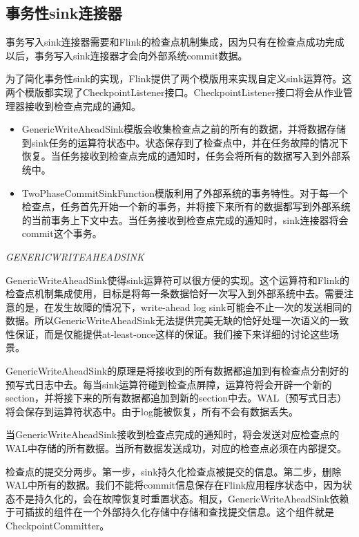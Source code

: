 \documentclass[cn,11pt,chinese]{elegantbook}
\providecommand{\tightlist}{%
  \setlength{\itemsep}{0pt}\setlength{\parskip}{0pt}}
\begin{document}
\hypertarget{ux4e8bux52a1ux6027sinkux8fdeux63a5ux5668}{%
\subsection{事务性sink连接器}\label{ux4e8bux52a1ux6027sinkux8fdeux63a5ux5668}}

事务写入sink连接器需要和Flink的检查点机制集成，因为只有在检查点成功完成以后，事务写入sink连接器才会向外部系统commit数据。

为了简化事务性sink的实现，Flink提供了两个模版用来实现自定义sink运算符。这两个模版都实现了CheckpointListener接口。CheckpointListener接口将会从作业管理器接收到检查点完成的通知。

\begin{itemize}
\tightlist
\item
  GenericWriteAheadSink模版会收集检查点之前的所有的数据，并将数据存储到sink任务的运算符状态中。状态保存到了检查点中，并在任务故障的情况下恢复。当任务接收到检查点完成的通知时，任务会将所有的数据写入到外部系统中。
\item
  TwoPhaseCommitSinkFunction模版利用了外部系统的事务特性。对于每一个检查点，任务首先开始一个新的事务，并将接下来所有的数据都写到外部系统的当前事务上下文中去。当任务接收到检查点完成的通知时，sink连接器将会commit这个事务。
\end{itemize}

\emph{GENERICWRITEAHEADSINK}

GenericWriteAheadSink使得sink运算符可以很方便的实现。这个运算符和Flink的检查点机制集成使用，目标是将每一条数据恰好一次写入到外部系统中去。需要注意的是，在发生故障的情况下，write-ahead
log
sink可能会不止一次的发送相同的数据。所以GenericWriteAheadSink无法提供完美无缺的恰好处理一次语义的一致性保证，而是仅能提供at-least-once这样的保证。我们接下来详细的讨论这些场景。

GenericWriteAheadSink的原理是将接收到的所有数据都追加到有检查点分割好的预写式日志中去。每当sink运算符碰到检查点屏障，运算符将会开辟一个新的section，并将接下来的所有数据都追加到新的section中去。WAL（预写式日志）将会保存到运算符状态中。由于log能被恢复，所有不会有数据丢失。

当GenericWriteAheadSink接收到检查点完成的通知时，将会发送对应检查点的WAL中存储的所有数据。当所有数据发送成功，对应的检查点必须在内部提交。

检查点的提交分两步。第一步，sink持久化检查点被提交的信息。第二步，删除WAL中所有的数据。我们不能将commit信息保存在Flink应用程序状态中，因为状态不是持久化的，会在故障恢复时重置状态。相反，GenericWriteAheadSink依赖于可插拔的组件在一个外部持久化存储中存储和查找提交信息。这个组件就是CheckpointCommitter。
\end{document}
